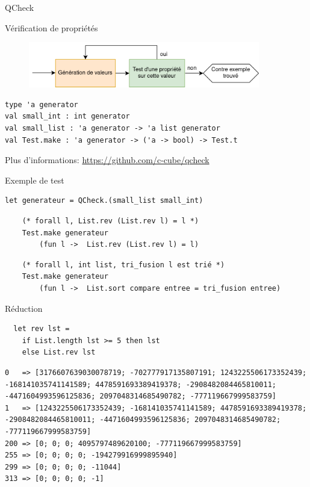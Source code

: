 
\begin{frame}[fragile]{QCheck}
    
Vérification de propriétés

\begin{figure}
    \centering
    \includegraphics[width=0.9\textwidth]{slides/images/qcheck.drawio.png}
\end{figure}


\begin{lstlisting}
type 'a generator
val small_int : int generator
val small_list : 'a generator -> 'a list generator
val Test.make : 'a generator -> ('a -> bool) -> Test.t
\end{lstlisting}

Plus d'informations: \url{https://github.com/c-cube/qcheck}
\end{frame}

\begin{frame}[fragile]{Exemple de test}

\begin{lstlisting}
let generateur = QCheck.(small_list small_int)
\end{lstlisting}

\begin{lstlisting}
    (* forall l, List.rev (List.rev l) = l *)
    Test.make generateur 
        (fun l ->  List.rev (List.rev l) = l)
\end{lstlisting}
\pause
{}
\begin{lstlisting}
    (* forall l, int list, tri_fusion l est trié *)
    Test.make generateur
        (fun l ->  List.sort compare entree = tri_fusion entree)
\end{lstlisting}

\end{frame}

\begin{frame}[fragile]{Réduction}
    
\begin{lstlisting}
  let rev lst = 
    if List.length lst >= 5 then lst
    else List.rev lst
\end{lstlisting}
\begin{lstlisting}
0   => [3176607639030078719; -702777917135807191; 1243225506173352439; -168141035741141589; 4478591693389419378; -2908482084465810011; -4471604993596125836; 2097048314685490782; -777119667999583759]
1   => [1243225506173352439; -168141035741141589; 4478591693389419378; -2908482084465810011; -4471604993596125836; 2097048314685490782; -777119667999583759]
200 => [0; 0; 0; 4095797489620100; -777119667999583759]
255 => [0; 0; 0; 0; -194279916999895940]
299 => [0; 0; 0; 0; -11044]
313 => [0; 0; 0; 0; -1]
\end{lstlisting}

\end{frame}


